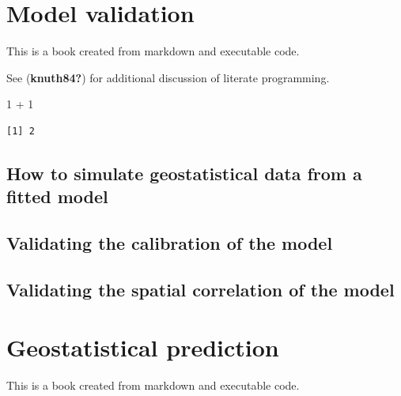 \documentclass[
  letterpaper,
]{krantz}
\newenvironment{Shaded}{\begin{snugshade}}{\end{snugshade}}
\newcommand{\DecValTok}[1]{\textcolor[rgb]{0.68,0.00,0.00}{#1}}
\newcommand{\SpecialCharTok}[1]{\textcolor[rgb]{0.37,0.37,0.37}{#1}}
\begin{document}

\hypertarget{sec-validation}{%
\chapter{Model validation}\label{sec-validation}}

This is a book created from markdown and executable code.

See (\textbf{knuth84?}) for additional discussion of literate
programming.

\begin{Shaded}
\begin{Highlighting}[]
\DecValTok{1} \SpecialCharTok{+} \DecValTok{1}
\end{Highlighting}
\end{Shaded}

\begin{verbatim}
[1] 2
\end{verbatim}

\hypertarget{how-to-simulate-geostatistical-data-from-a-fitted-model}{%
\section{How to simulate geostatistical data from a fitted
model}\label{how-to-simulate-geostatistical-data-from-a-fitted-model}}

\hypertarget{validating-the-calibration-of-the-model}{%
\section{Validating the calibration of the
model}\label{validating-the-calibration-of-the-model}}

\hypertarget{validating-the-spatial-correlation-of-the-model}{%
\section{Validating the spatial correlation of the
model}\label{validating-the-spatial-correlation-of-the-model}}


\hypertarget{sec-geo-prediction}{%
\chapter{Geostatistical prediction}\label{sec-geo-prediction}}

This is a book created from markdown and executable code.
\end{document}
